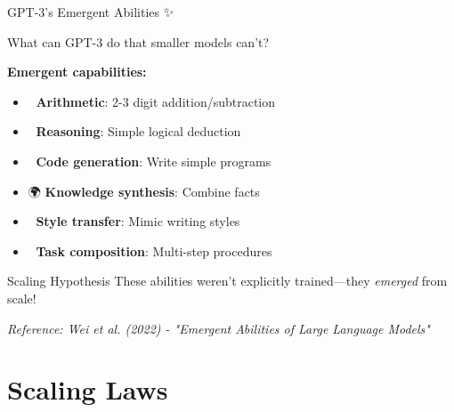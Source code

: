 \documentclass[aspectratio=169]{beamer}
\begin{document}
\begin{frame}[shrink=10]{GPT-3's Emergent Abilities ✨}
    \begin{discussion}
        What can GPT-3 do that smaller models can't?
    \end{discussion}

    \vspace{0.3cm}

    \textbf{Emergent capabilities:}
    \begin{itemize}\setlength{\itemsep}{0pt}
        \item 🧮 \textbf{Arithmetic}: 2-3 digit addition/subtraction
        \item 💭 \textbf{Reasoning}: Simple logical deduction
        \item 🎨 \textbf{Code generation}: Write simple programs
        \item 🌍 \textbf{Knowledge synthesis}: Combine facts
        \item 📝 \textbf{Style transfer}: Mimic writing styles
        \item 🎯 \textbf{Task composition}: Multi-step procedures
    \end{itemize}

    \vspace{0.3cm}

    \begin{alertblock}{Scaling Hypothesis}
        These abilities weren't explicitly trained—they \textit{emerged} from scale!
    \end{alertblock}

    \vspace{0.3cm}

    \small
    \textit{Reference: Wei et al. (2022) - "Emergent Abilities of Large Language Models"}
\end{frame}

\section{Scaling Laws}
\end{document}
